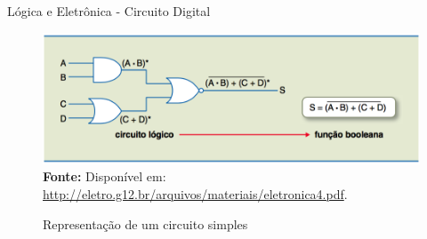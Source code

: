 	\begin{frame}{Lógica e Eletrônica - Circuito Digital}
		\begin{figure}[h]
			\centering
			\caption{Representação de um circuito simples}
			\includegraphics[height=0.6\textheight]{img/ed/ed-circuito.png}
			\\
			{\footnotesize \textbf{Fonte:} Disponível em: \url{http://eletro.g12.br/arquivos/materiais/eletronica4.pdf}.}
			\label{fig:ed-circuito}
		\end{figure}
	\end{frame}

